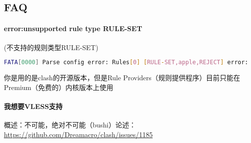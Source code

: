 \subsection{FAQ}

\paragraph{error:unsupported rule type RULE-SET}(不支持的规则类型RULE-SET)
\begin{lstlisting}[breaklines=true,language=sh]
FATA[0000] Parse config error: Rules[0] [RULE-SET,apple,REJECT] error: unsupported rule type RULE-SET
\end{lstlisting}
你是用的是clash的开源版本，但是Rule Providers（规则提供程序）目前只能在Premium（免费的）内核版本上使用

\paragraph{我想要VLESS支持}概述：不可能，绝对不可能（bushi）论述：\url{https://github.com/Dreamacro/clash/issues/1185}
